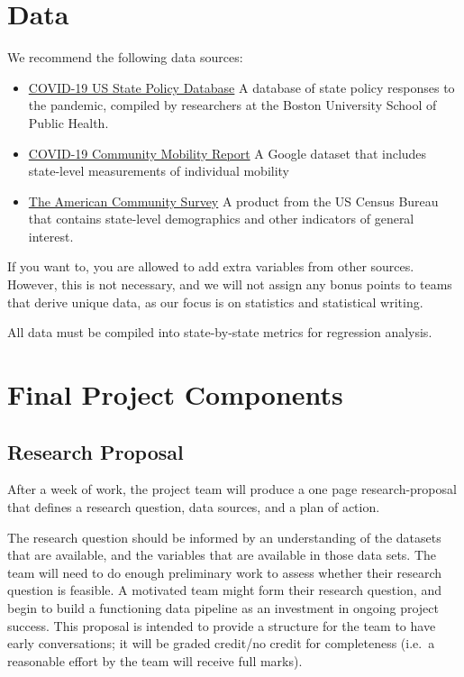 \documentclass[
]{article}
\providecommand{\tightlist}{%
  \setlength{\itemsep}{0pt}\setlength{\parskip}{0pt}}
\begin{document}
\hypertarget{data}{%
\section{Data}\label{data}}

We recommend the following data sources:

\begin{itemize}
\tightlist
\item
  \href{www.tinyurl.com/statepolicies}{COVID-19 US State Policy
  Database} A database of state policy responses to the pandemic,
  compiled by researchers at the Boston University School of Public
  Health.
\item
  \href{https://www.google.com/covid19/mobility/}{COVID-19 Community
  Mobility Report} A Google dataset that includes state-level
  measurements of individual mobility
\item
  \href{https://data.census.gov/cedsci/table?q=ACS\&g=0100000US.04000.001\&tid=ACSDP1Y2019.DP05\&moe=false\&hidePreview=true}{The
  American Community Survey} A product from the US Census Bureau that
  contains state-level demographics and other indicators of general
  interest.
\end{itemize}

If you want to, you are allowed to add extra variables from other
sources. However, this is not necessary, and we will not assign any
bonus points to teams that derive unique data, as our focus is on
statistics and statistical writing.

All data must be compiled into state-by-state metrics for regression
analysis.

\hypertarget{final-project-components}{%
\section{Final Project Components}\label{final-project-components}}

\hypertarget{research-proposal}{%
\subsection{Research Proposal}\label{research-proposal}}

After a week of work, the project team will produce a one page
research-proposal that defines a research question, data sources, and a
plan of action.

The research question should be informed by an understanding of the
datasets that are available, and the variables that are available in
those data sets. The team will need to do enough preliminary work to
assess whether their research question is feasible. A motivated team
might form their research question, and begin to build a functioning
data pipeline as an investment in ongoing project success. This proposal
is intended to provide a structure for the team to have early
conversations; it will be graded credit/no credit for completeness
(i.e.~a reasonable effort by the team will receive full marks).
\end{document}
